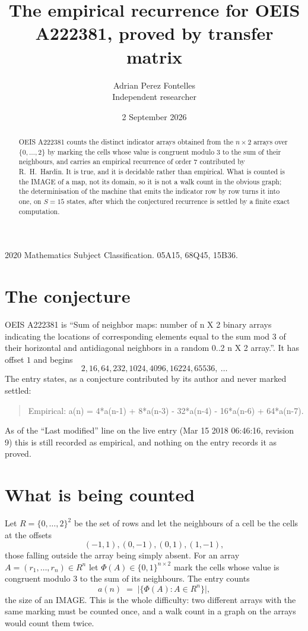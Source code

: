 \documentclass[11pt,a4paper]{article}
\title{The empirical recurrence for OEIS A222381, proved by transfer matrix}
\author{Adrian Perez Fontelles\\ \small Independent researcher}
\date{2 September 2026}
\theoremstyle{plain}
\theoremstyle{definition}
\begin{document}
\maketitle

\begin{abstract}
OEIS A222381 counts the distinct indicator arrays obtained from the $n\times2$ arrays over
$\{0,\dots,2\}$ by marking the cells whose value is congruent modulo 3 to the sum of their neighbours, and carries an
empirical recurrence of order $7$ contributed by R.~H.~Hardin. It is true, and it is
decidable rather than empirical. What is counted is the IMAGE of a map, not its domain, so it
is not a walk count in the obvious graph; the determinisation of the machine that emits the
indicator row by row turns it into one, on $S=15$ states, after which the conjectured
recurrence is settled by a finite exact computation.
\end{abstract}

\noindent\small 2020 Mathematics Subject Classification. 05A15, 68Q45, 15B36.\normalsize

\section{The conjecture}

OEIS A222381 is ``Sum of neighbor maps: number of n X 2 binary arrays indicating the locations of corresponding elements equal to the sum mod 3 of their horizontal and antidiagonal neighbors in a random 0..2 n X 2 array.''. It has offset $1$ and begins
\[
2, 16, 64, 232, 1024, 4096, 16224, 65536,\ \dots
\]
The entry states, as a conjecture contributed by its author and never marked settled:
\begin{quote}
Empirical: a(n) = 4*a(n-1) + 8*a(n-3) - 32*a(n-4) - 16*a(n-6) + 64*a(n-7).
\end{quote}
As of the ``Last modified'' line on the live entry (Mar 15 2018 06:46:16, revision 9) this is still
recorded as empirical, and nothing on the entry records it as proved.

\section{What is being counted}

Let $R=\{0,\dots,2\}^{2}$ be the set of rows and let the neighbours of a cell be the
cells at the offsets
\[
(-1,1), (0,-1), (0,1), (1,-1),
\]
those falling outside the array being simply absent. For an array
$A=(r_1,\dots,r_n)\in R^n$ let $\Phi(A)\in\{0,1\}^{n\times2}$ mark the cells whose value
is congruent modulo 3 to the sum of its neighbours. The entry counts
\[
a(n)\;=\;\bigl|\{\Phi(A):A\in R^n\}\bigr| ,
\]
the size of an IMAGE. This is the whole difficulty: two different arrays with the same marking
must be counted once, and a walk count in a graph on the arrays would count them twice.
\end{document}
